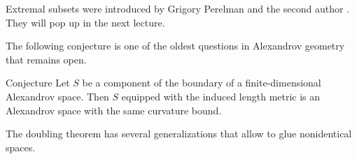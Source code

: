 Extremal subsets were introduced by Grigory Perelman and the second author \cite{perelman-petrunin}.
They will pop up in the next lecture.

The following conjecture is one of the oldest questions in Alexandrov geometry that remains open.

\begin{thm}{Conjecture}
Let $S$ be a component of the boundary of a finite-dimensional Alexandrov space.
Then $S$ equipped with the induced length metric is an Alexandrov space with the same curvature bound.
\end{thm}

The doubling theorem has several generalizations \cite{petrunin1997,ge-li} that allow to glue nonidentical spaces.
